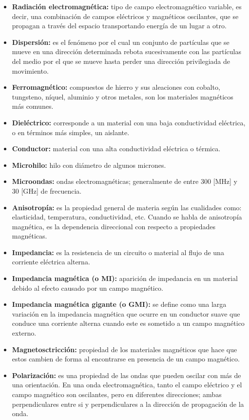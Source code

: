 \documentclass[12pt,letterpaper]{report}
\numberwithin{equation}{section}
\begin{document}
\begin{itemize}
	\item \textbf{Radiación electromagnética:} tipo de campo electromagnético variable, es decir, una combinación de campos eléctricos y magnéticos oscilantes, que se propagan a través del espacio transportando energía de un lugar a otro.
	\item \textbf{Dispersión:} es el fenómeno por el cual un conjunto de partículas que se mueve en una dirección determinada rebota sucesivamente con las partículas del medio por el que se mueve hasta perder una dirección privilegiada de movimiento. 
	\item \textbf{Ferromagnético:} compuestos de hierro y sus aleaciones con cobalto, tungsteno, níquel, aluminio y otros metales, son los materiales magnéticos más comunes.
	\item \textbf{Dieléctrico:} corresponde a un material con una baja conductividad eléctrica, o en términos más simples, un aislante.
	\item \textbf{Conductor:} material con una alta conductividad eléctrica o térmica.
	\item \textbf{Microhilo:} hilo con diámetro de algunos micrones.
	\item \textbf{Microondas:} ondas electromagnéticas; generalmente de entre 300 [MHz] y 30 [GHz] de frecuencia.
	\item \textbf{Anisotropía:} es la propiedad general de materia según las cualidades como: elasticidad, temperatura, conductividad, etc. Cuando se habla de anisotropía magnética, es la dependencia direccional con respecto a propiedades magnéticas.
	\item \textbf{Impedancia:} es la resistencia de un circuito o material al flujo de una corriente eléctrica alterna.
	\item \textbf{Impedancia magnética (o MI):} aparición de impedancia en un material debido al efecto causado por un campo magnético.
	\item \textbf{Impedancia magnética gigante (o GMI):} se define como una larga variación en la impedancia magnética que ocurre en un conductor suave que conduce una corriente alterna cuando este es sometido a un campo magnético externo.
	\item \textbf{Magnetosctricción:} propiedad de los materiales magnéticos que hace que estos cambien de forma al encontrarse en presencia de un campo magnético.
	\item \textbf{Polarización:} es una propiedad de las ondas que pueden oscilar con más de una orientación. En una onda electromagnética, tanto el campo eléctrico y el campo magnético son oscilantes, pero en diferentes direcciones; ambas perpendiculares entre si y perpendiculares a la dirección de propagación de la onda.

\end{itemize}
\end{document}
